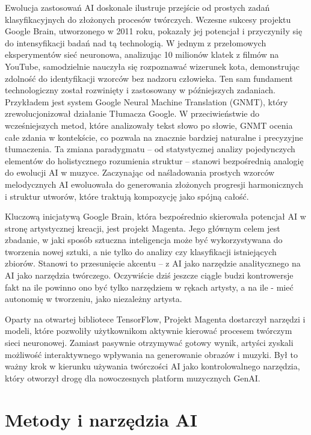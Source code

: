 Ewolucja zastosowań AI doskonale ilustruje przejście od prostych zadań klasyfikacyjnych do złożonych procesów twórczych. Wczesne sukcesy projektu Google Brain, utworzonego w 2011 roku, pokazały jej potencjał i przyczyniły się do intensyfikacji badań nad tą technologią. W jednym z przełomowych eksperymentów \cite{markoff2012how} sieć neuronowa, analizując 10 milionów klatek z filmów na YouTube, samodzielnie nauczyła się rozpoznawać wizerunek kota, demonstrując zdolność do identyfikacji wzorców bez nadzoru człowieka. Ten sam fundament technologiczny został rozwinięty i zastosowany w późniejszych zadaniach. Przykładem jest system Google Neural Machine Translation (GNMT), który zrewolucjonizował działanie Tłumacza Google. W przeciwieństwie do wcześniejszych metod, które analizowały tekst słowo po słowie, GNMT ocenia całe zdania w kontekście, co pozwala na znacznie bardziej naturalne i precyzyjne tłumaczenia. Ta zmiana paradygmatu – od statystycznej analizy pojedynczych elementów do holistycznego rozumienia struktur – stanowi bezpośrednią analogię do ewolucji AI w muzyce. Zaczynając od naśladowania prostych wzorców melodycznych AI ewoluowała do generowania złożonych progresji harmonicznych i struktur utworów, które traktują kompozycję jako spójną całość.

Kluczową inicjatywą Google Brain, która bezpośrednio skierowała potencjał AI w stronę artystycznej kreacji, jest projekt Magenta. Jego głównym celem jest zbadanie, w jaki sposób sztuczna inteligencja może być wykorzystywana do tworzenia nowej sztuki, a nie tylko do analizy czy klasyfikacji istniejących zbiorów. Stanowi to przesunięcie akcentu – z AI jako narzędzie analitycznego na AI jako narzędzia twórczego. Oczywiście dziś jeszcze ciągle budzi kontrowersje fakt na ile powinno ono być tylko narzędziem w rękach artysty, a na ile - mieć autonomię w tworzeniu, jako niezależny artysta.

Oparty na otwartej bibliotece TensorFlow, Projekt Magenta dostarczył narzędzi i modeli, które pozwoliły użytkownikom aktywnie kierować procesem twórczym sieci neuronowej. Zamiast pasywnie otrzymywać gotowy wynik, artyści zyskali możliwość interaktywnego wpływania na generowanie obrazów i muzyki. Był to ważny krok w kierunku używania twórczości AI jako kontrolowalnego narzędzia, który otworzył drogę dla nowoczesnych platform muzycznych GenAI.

\section{Metody i narzędzia AI}

